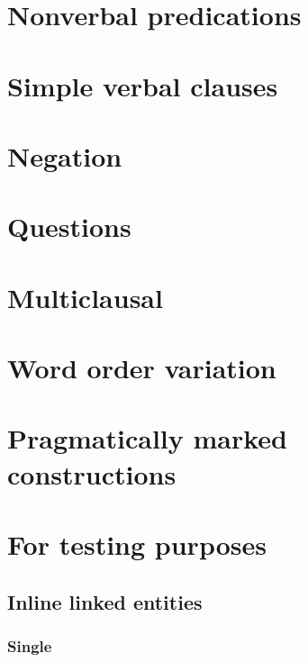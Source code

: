 \documentclass{memoir}
\begin{document}
\chapter{\texorpdfstring{Nonverbal predications
\label{nonverbal}}{Nonverbal predications }}

\chapter{\texorpdfstring{Simple verbal clauses
\label{simpleverb}}{Simple verbal clauses }}

\chapter{\texorpdfstring{Negation \label{negation}}{Negation }}

\chapter{\texorpdfstring{Questions \label{questions}}{Questions }}

\chapter{\texorpdfstring{Multiclausal
\label{multiclausal}}{Multiclausal }}

\chapter{\texorpdfstring{Word order variation
\label{wordorder}}{Word order variation }}

\chapter{\texorpdfstring{Pragmatically marked constructions
\label{marked}}{Pragmatically marked constructions }}

\chapter{For testing purposes}

\section{Inline linked entities}

\subsection{Single}
\end{document}
